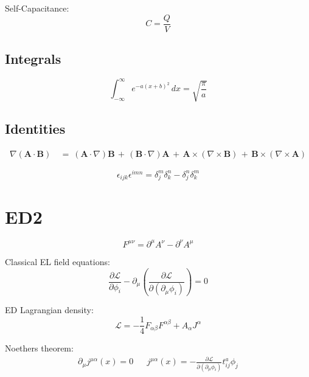\documentclass[a4paper, twocolumn]{article}
\begin{document}
Self-Capacitance:
\begin{equation*}
    C = \frac{Q}{V}
\end{equation*}

\subsection{Integrals}

\begin{equation}
    \int_{-\infty}^{\infty}  e^{-a(x+b)^2}\,dx= \sqrt{\frac{\pi}{a}}
\end{equation}

\subsection{Identities}

\begin{align*}
  \nabla(\mathbf{A} \cdot \mathbf{B}) &\ =\  (\mathbf{A} \cdot \nabla)\mathbf{B} \,+\,  (\mathbf{B} \cdot \nabla)\mathbf{A} \,+\,  \mathbf{A} {\times} (\nabla {\times} \mathbf{B}) \,+\,  \mathbf{B} {\times} (\nabla {\times} \mathbf{A})
\end{align*}

\begin{equation*}
    \epsilon_{ijk} \epsilon^{imn} = \delta_{j}^{m} \delta_{k}^{n} - \delta_{j}^{n} \delta_{k}^{m}
\end{equation*}

\section{ED2}

\begin{equation*}
    F^{\mu \nu} = \partial^{\mu} A^{\nu} - \partial^{\nu} A^{\mu}
\end{equation*}


Classical EL field equations:
\begin{equation*}
    \frac{\partial \mathcal{L}}{\partial \phi_{i}} - \partial_{\mu} \left( \frac{\partial \mathcal{L}}{\partial (\partial_{\mu} \phi_i)} \right) = 0
\end{equation*}

ED Lagrangian density:
\begin{equation*}
    \mathcal{L} = -\frac{1}{4} F_{\alpha \beta} F^{\alpha \beta} + A_{\alpha} J^{\alpha}
\end{equation*}

Noethers theorem:
\begin{align*}
    \partial_{\mu} j^{\mu \alpha}(x) = 0 &&
    j^{\mu \alpha}(x) = -\frac{\partial \mathcal{L}}{\partial (\partial_{\mu} \phi_{i})} t^{a}_{ij} \phi_{j}
\end{align*}
\end{document}
